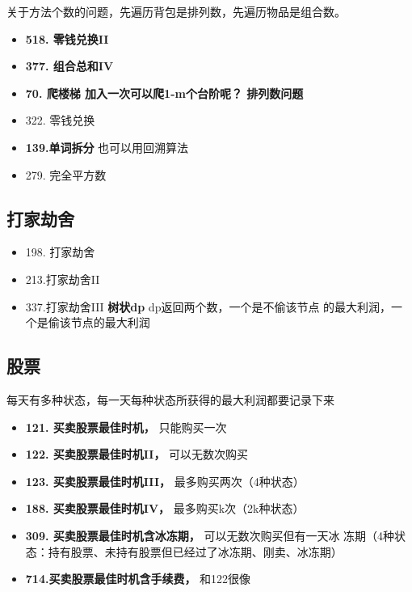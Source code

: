 \documentclass[a4paper,twoside]{ctexart}
\begin{document}
关于方法个数的问题，先遍历背包是排列数，先遍历物品是组合数。

\begin{itemize}
\item \textbf{518. 零钱兑换II}
\item \textbf{377. 组合总和IV}
\item \textbf{70. 爬楼梯 加入一次可以爬1-m个台阶呢？ 排列数问题}
\item 322. 零钱兑换
\item \textbf{139.单词拆分} 也可以用回溯算法
\item 279. 完全平方数
\end{itemize}


\subsection{打家劫舍}

\begin{itemize}
\item 198. 打家劫舍
\item 213.打家劫舍II 
\item 337.打家劫舍III  \textbf{树状dp} dp返回两个数，一个是不偷该节点
  的最大利润，一个是偷该节点的最大利润
\end{itemize}

\subsection{股票}

每天有多种状态，每一天每种状态所获得的最大利润都要记录下来

\begin{itemize}
\item \textbf{121. 买卖股票最佳时机， }   只能购买一次
\item \textbf{122. 买卖股票最佳时机II，} 可以无数次购买
\item \textbf{123. 买卖股票最佳时机III，} 最多购买两次（4种状态）
\item \textbf{188. 买卖股票最佳时机IV，} 最多购买k次（2k种状态）
\item \textbf{309. 买卖股票最佳时机含冰冻期，} 可以无数次购买但有一天冰
  冻期（4种状态：持有股票、未持有股票但已经过了冰冻期、刚卖、冰冻期）
\item \textbf{714.买卖股票最佳时机含手续费，} 和122很像

\end{itemize}
\end{document}
